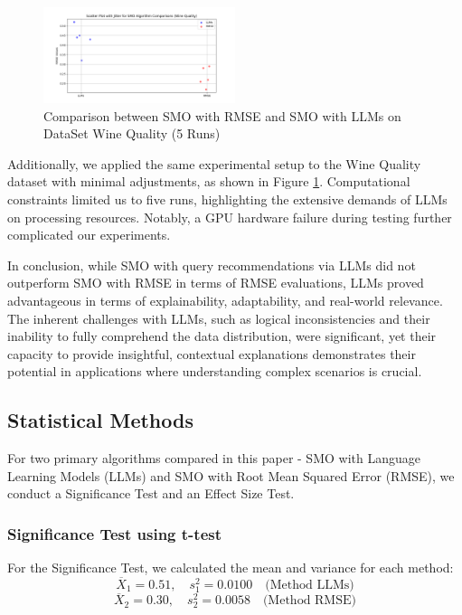 \documentclass{ieeeaccess}
\begin{document}
    \begin{figure}
    \centering
    \includegraphics[page=1,width=0.5\textwidth]{llms_vs_rmse_5_run_wine.png}
    \caption{Comparison between SMO with RMSE and SMO with LLMs on DataSet Wine Quality (5 Runs) }\label{fig.5}
    \end{figure}
    
    Additionally, we applied the same experimental setup to the Wine Quality dataset with minimal adjustments, as shown in Figure \ref{fig.5}. Computational constraints limited us to five runs, highlighting the extensive demands of LLMs on processing resources. Notably, a GPU hardware failure during testing further complicated our experiments.
    
    In conclusion, while SMO with query recommendations via LLMs did not outperform SMO with RMSE in terms of RMSE evaluations, LLMs proved advantageous in terms of explainability, adaptability, and real-world relevance. The inherent challenges with LLMs, such as logical inconsistencies and their inability to fully comprehend the data distribution, were significant, yet their capacity to provide insightful, contextual explanations demonstrates their potential in applications where understanding complex scenarios is crucial.

\subsection{Statistical Methods}
For two primary algorithms compared in this paper - SMO with Language Learning Models (LLMs) and SMO with Root Mean Squared Error (RMSE), we conduct a Significance Test and an Effect Size Test.

\subsubsection{Significance Test using t-test}
For the Significance Test, we calculated the mean and variance for each method:
\[
\overline{X}_1 = 0.51, \quad s_1^2 = 0.0100 \quad \text{(Method LLMs)}
\]
\[
\overline{X}_2 = 0.30, \quad s_2^2 = 0.0058 \quad \text{(Method RMSE)}
\]
\end{document}
